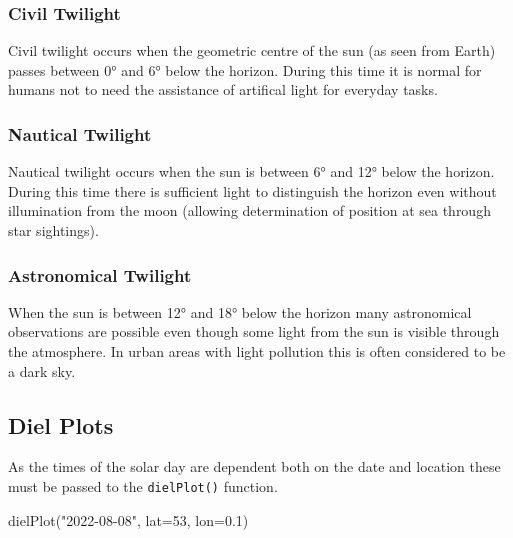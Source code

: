 \documentclass[
]{book}
\newenvironment{Shaded}{\begin{snugshade}}{\end{snugshade}}
\newcommand{\AttributeTok}[1]{\textcolor[rgb]{0.77,0.63,0.00}{#1}}
\newcommand{\DecValTok}[1]{\textcolor[rgb]{0.00,0.00,0.81}{#1}}
\newcommand{\FloatTok}[1]{\textcolor[rgb]{0.00,0.00,0.81}{#1}}
\newcommand{\FunctionTok}[1]{\textcolor[rgb]{0.00,0.00,0.00}{#1}}
\newcommand{\NormalTok}[1]{#1}
\newcommand{\StringTok}[1]{\textcolor[rgb]{0.31,0.60,0.02}{#1}}
\begin{document}
\hypertarget{civil-twilight}{%
\subsubsection{Civil Twilight}\label{civil-twilight}}

Civil twilight occurs when the geometric centre of the sun (as seen from Earth) passes between 0° and 6° below the horizon. During this time it is normal for humans not to need the assistance of artifical light for everyday tasks.

\hypertarget{nautical-twilight}{%
\subsubsection{Nautical Twilight}\label{nautical-twilight}}

Nautical twilight occurs when the sun is between 6° and 12° below the horizon. During this time there is sufficient light to distinguish the horizon even without illumination from the moon (allowing determination of position at sea through star sightings).

\hypertarget{astronomical-twilight}{%
\subsubsection{Astronomical Twilight}\label{astronomical-twilight}}

When the sun is between 12° and 18° below the horizon many astronomical observations are possible even though some light from the sun is visible through the atmosphere. In urban areas with light pollution this is often considered to be a dark sky.

\hypertarget{diel-plots}{%
\subsection{Diel Plots}\label{diel-plots}}

As the times of the solar day are dependent both on the date and location these must be passed to the \texttt{dielPlot()} function.

\begin{Shaded}
\begin{Highlighting}[]
\FunctionTok{dielPlot}\NormalTok{(}\StringTok{"2022{-}08{-}08"}\NormalTok{, }\AttributeTok{lat=}\DecValTok{53}\NormalTok{, }\AttributeTok{lon=}\FloatTok{0.1}\NormalTok{)}
\end{Highlighting}
\end{Shaded}
\end{document}
